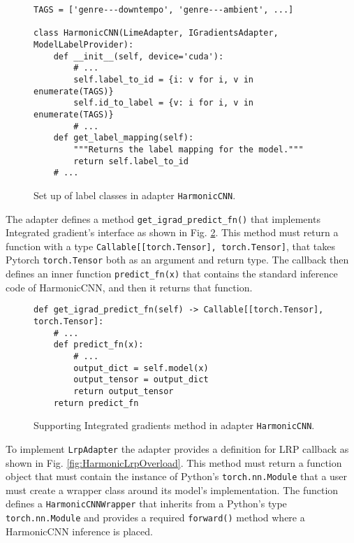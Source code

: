 \documentclass[
    bindingoffset=5mm,  %
    footnoteindent=3mm, %
    hyphenation=true    %
]{src/wut-thesis}
\begin{document}
\begin{figure}[h!]
\begin{verbatim}
TAGS = ['genre---downtempo', 'genre---ambient', ...]

class HarmonicCNN(LimeAdapter, IGradientsAdapter, ModelLabelProvider):
    def __init__(self, device='cuda'):
        # ...
        self.label_to_id = {i: v for i, v in enumerate(TAGS)}
        self.id_to_label = {v: i for i, v in enumerate(TAGS)}
        # ...
    def get_label_mapping(self):
        """Returns the label mapping for the model."""
        return self.label_to_id
    # ...
\end{verbatim}
\caption{Set up of label classes in adapter \texttt{HarmonicCNN}.}
\label{fig:HarmonicLabelMapping}
\end{figure}

The adapter defines a method \texttt{get_igrad_predict_fn()} that implements
Integrated gradient's interface as shown in Fig. \ref{fig:HarmonicIgradOverload}.
This method must return a function with a type \texttt{Callable[[torch.Tensor], torch.Tensor]},
that takes Pytorch \texttt{torch.Tensor} both as an argument and return type.
The callback then defines an inner function \texttt{predict_fn(x)} that contains
the standard inference code of HarmonicCNN, and then it returns that function.

\begin{figure}%
\begin{verbatim}
def get_igrad_predict_fn(self) -> Callable[[torch.Tensor], torch.Tensor]:
    # ...
    def predict_fn(x):
        # ... 
        output_dict = self.model(x)
        output_tensor = output_dict
        return output_tensor
    return predict_fn
\end{verbatim}
\caption{Supporting Integrated gradients method in adapter \texttt{HarmonicCNN}.}
\label{fig:HarmonicIgradOverload}
\end{figure}

To implement \texttt{LrpAdapter} the adapter provides a definition for LRP
callback as shown in Fig. \ref{fig:HarmonicLrpOverload}. This method must return
a function object that must contain the instance of Python's \texttt{torch.nn.Module} that
a user must create a wrapper class around its model’s implementation.
The function defines a \texttt{HarmonicCNNWrapper} that inherits from 
a Python's type \texttt{torch.nn.Module} and provides a required
\texttt{forward()} method where a HarmonicCNN inference is placed.
\end{document}
